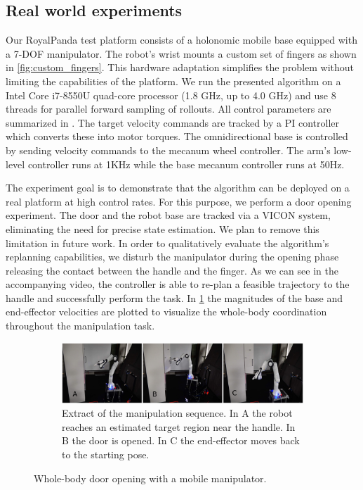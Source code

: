 \subsection{Real world experiments}
Our RoyalPanda test platform consists of a holonomic mobile base equipped with a 7-DOF manipulator. The robot's wrist mounts a custom set of fingers as shown in \fig\ref{fig:custom_fingers}. This hardware adaptation simplifies the problem without limiting the capabilities of the platform. We run the presented algorithm on a Intel Core i7-8550U quad-core processor (1.8 GHz, up to 4.0 GHz) and use 8 threads for parallel forward sampling of rollouts. All control parameters are summarized in \tab {}. The target velocity commands are tracked by a PI controller which converts these into motor torques. The omnidirectional base is controlled by sending velocity commands to the mecanum wheel controller. The arm's low-level controller runs at 1KHz while the base mecanum controller runs at 50Hz.


The experiment goal is to demonstrate that the algorithm can be deployed on a real platform at high control rates. For this purpose, we perform a door opening experiment. The door and the robot base are tracked via a VICON system, eliminating the need for precise state estimation. We plan to remove this limitation in future work. In order to qualitatively evaluate the algorithm's replanning capabilities, we disturb the manipulator during the opening phase releasing the contact between the handle and the finger. As we can see in the accompanying video, the controller is able to re-plan a feasible trajectory to the handle and successfully perform the task.     
In \fig\ref{fig:mobile_manipulation_hardware} the magnitudes of the base and end-effector velocities are plotted to visualize the whole-body coordination throughout the manipulation task.

\begin{figure}[t]
\centering
\begin{subfigure}{\columnwidth}
    \includegraphics[width=\linewidth]{figures/robot_experiments/mobile_robot_montage-compressed.pdf}
    \caption{Extract of the manipulation sequence. In A the robot reaches an estimated target region near the handle. In B the door is opened. In C the end-effector moves back to the starting pose.}
\end{subfigure}%
\caption{Whole-body door opening with a mobile manipulator.} \label{fig:mobile_manipulation_hardware}
\end{figure}